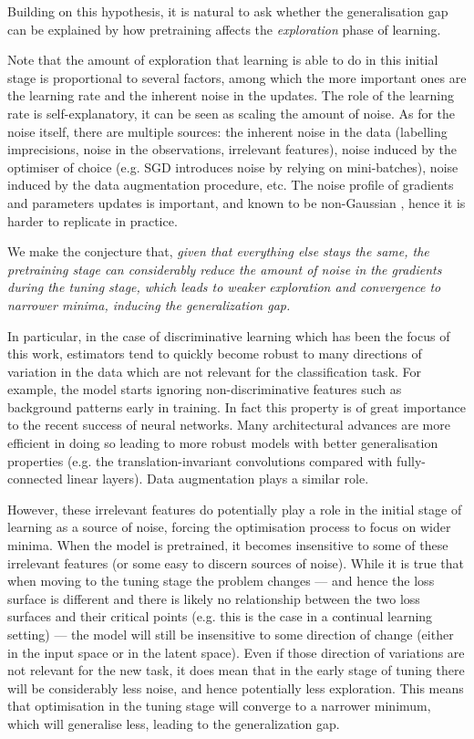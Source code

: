 Building on this hypothesis, it is natural to ask whether the generalisation gap can be explained by how pretraining affects the \textit{exploration} phase of learning. 

Note that the amount of exploration that learning is able to do in this initial stage is proportional to several factors, among which the more important ones are the learning rate and the inherent noise in the updates. The role of the learning rate is self-explanatory, it can be seen as scaling the amount of noise. 
%
As for the noise itself, there are multiple sources: the inherent noise in the data (labelling imprecisions, noise in the observations, irrelevant features), noise induced by the optimiser of choice (e.g. SGD introduces noise by relying on mini-batches), noise induced by the data augmentation procedure, etc.
%
The noise profile of gradients and parameters updates is important, and known to be non-Gaussian \cite{simsekli2019tail}, hence it is harder to replicate in practice.

We make the conjecture that, \emph{given that everything else stays the same, the pretraining stage can considerably reduce the amount of noise in the gradients during the tuning stage, which leads to weaker exploration and convergence to narrower minima, inducing the generalization gap.}

In particular, in the case of discriminative learning which has been the focus of this work, estimators tend to quickly become robust to many directions of variation in the data which are not relevant for the classification task. For example, the model starts ignoring non-discriminative features such as background patterns early in training. In fact this property is of great importance to the recent success of neural networks. Many architectural advances are more efficient in doing so leading to more robust models with better generalisation properties (e.g. the translation-invariant convolutions compared with fully-connected linear layers). Data augmentation plays a similar role.


However, these irrelevant features do potentially play a role in the initial stage of learning as a source of noise, forcing the optimisation process to focus on wider minima. When the model is pretrained, it becomes insensitive to some of these irrelevant features (or some easy to discern sources of noise). While it is true that when moving to the tuning stage the problem changes --- and hence the loss surface is different and there is likely no relationship between the two loss surfaces and their critical points (e.g. this is the case in a continual learning setting) --- the model will still be insensitive to some direction of change (either in the input space or in the latent space). Even if those direction of variations are not relevant for the new task, it does mean that in the early stage of tuning there will be considerably less noise, and hence potentially less exploration. This means that optimisation in the tuning stage will converge to a narrower minimum, which will generalise less, leading to the generalization gap. 

